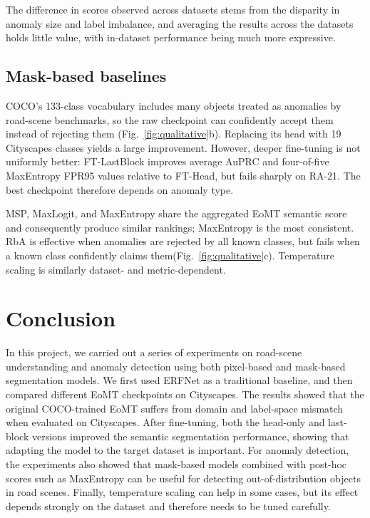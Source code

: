 \documentclass[10pt,twocolumn,letterpaper]{article}
\begin{document}
The difference in scores observed across datasets stems from the disparity in anomaly size and label imbalance, and averaging the results across the datasets holds little value, with in-dataset performance being much more expressive.

\subsection{Mask-based baselines}
COCO's 133-class vocabulary includes many objects treated as anomalies by road-scene benchmarks, so the raw checkpoint can confidently accept them instead of rejecting them (Fig.~\ref{fig:qualitative}b). Replacing its head with 19 Cityscapes classes yields a large improvement. However, deeper fine-tuning is not uniformly better: FT-LastBlock improves average AuPRC and four-of-five MaxEntropy FPR95 values relative to FT-Head, but fails sharply on RA-21. The best checkpoint therefore depends on anomaly type.

MSP, MaxLogit, and MaxEntropy share the aggregated EoMT semantic score and consequently produce similar rankings; MaxEntropy is the most consistent. RbA is effective when anomalies are rejected by all known classes, but fails when a known class confidently claims them(Fig.~\ref{fig:qualitative}c). Temperature scaling is similarly dataset- and metric-dependent.

\section{Conclusion}

In this project, we carried out a series of experiments on road-scene understanding and anomaly detection using both pixel-based and mask-based segmentation models. We first used ERFNet as a traditional baseline, and then compared different EoMT checkpoints on Cityscapes. The results showed that the original COCO-trained EoMT suffers from domain and label-space mismatch when evaluated on Cityscapes. After fine-tuning, both the head-only and last-block versions improved the semantic segmentation performance, showing that adapting the model to the target dataset is important. For anomaly detection, the experiments also showed that mask-based models combined with post-hoc scores such as MaxEntropy can be useful for detecting out-of-distribution objects in road scenes. Finally, temperature scaling can help in some cases, but its effect depends strongly on the dataset and therefore needs to be tuned carefully.
\end{document}
